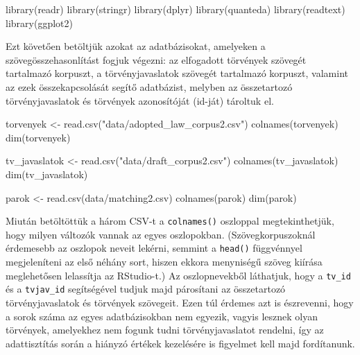 \documentclass[
]{book}
\newenvironment{Shaded}{\begin{snugshade}}{\end{snugshade}}
\newcommand{\FunctionTok}[1]{\textcolor[rgb]{0.00,0.00,0.00}{#1}}
\newcommand{\NormalTok}[1]{#1}
\newcommand{\OtherTok}[1]{\textcolor[rgb]{0.56,0.35,0.01}{#1}}
\newcommand{\StringTok}[1]{\textcolor[rgb]{0.31,0.60,0.02}{#1}}
\begin{document}
\begin{Shaded}
\begin{Highlighting}[]

\FunctionTok{library}\NormalTok{(readr)}
\FunctionTok{library}\NormalTok{(stringr)}
\FunctionTok{library}\NormalTok{(dplyr)}
\FunctionTok{library}\NormalTok{(quanteda)}
\FunctionTok{library}\NormalTok{(readtext)}
\FunctionTok{library}\NormalTok{(ggplot2)}
\end{Highlighting}
\end{Shaded}

Ezt követően betöltjük azokat az adatbázisokat, amelyeken a
szövegösszehasonlítást fogjuk végezni: az elfogadott törvények szövegét
tartalmazó korpuszt, a törvényjavaslatok szövegét tartalmazó korpuszt,
valamint az ezek összekapcsolását segítő adatbázist, melyben az
összetartozó törvényjavaslatok és törvények azonosítóját (id-ját)
tároltuk el.

\begin{Shaded}
\begin{Highlighting}[]
\NormalTok{torvenyek }\OtherTok{\textless{}{-}} \FunctionTok{read.csv}\NormalTok{(}\StringTok{"data/adopted\_law\_corpus2.csv"}\NormalTok{)}
\FunctionTok{colnames}\NormalTok{(torvenyek)}
\FunctionTok{dim}\NormalTok{(torvenyek)}
\end{Highlighting}
\end{Shaded}

\begin{Shaded}
\begin{Highlighting}[]
\NormalTok{tv\_javaslatok }\OtherTok{\textless{}{-}} \FunctionTok{read.csv}\NormalTok{(}\StringTok{"data/draft\_corpus2.csv"}\NormalTok{)}
\FunctionTok{colnames}\NormalTok{(tv\_javaslatok)}
\FunctionTok{dim}\NormalTok{(tv\_javaslatok)}
\end{Highlighting}
\end{Shaded}

\begin{Shaded}
\begin{Highlighting}[]
\NormalTok{parok }\OtherTok{\textless{}{-}} \FunctionTok{read.csv}\NormalTok{(}\StringTok{\textquotesingle{}data/matching2.csv\textquotesingle{}}\NormalTok{)}
\FunctionTok{colnames}\NormalTok{(parok)}
\FunctionTok{dim}\NormalTok{(parok)   }
\end{Highlighting}
\end{Shaded}

Miután betöltöttük a három CSV-t a \texttt{colnames()} oszloppal
megtekinthetjük, hogy milyen változók vannak az egyes oszlopokban.
(Szövegkorpuszoknál érdemesebb az oszlopok neveit lekérni, semmint a
\texttt{head()} függvénnyel megjeleníteni az első néhány sort, hiszen
ekkora menyniségű szöveg kiírása meglehetősen lelassítja az RStudio-t.)
Az oszlopnevekből láthatjuk, hogy a \texttt{tv\_id} és a
\texttt{tvjav\_id} segítségével tudjuk majd párosítani az összetartozó
törvényjavaslatok és törvények szövegeit. Ezen túl érdemes azt is
észrevenni, hogy a sorok száma az egyes adatbázisokban nem egyezik,
vagyis lesznek olyan törvények, amelyekhez nem fogunk tudni
törvényjavaslatot rendelni, így az adattisztítás során a hiányzó értékek
kezelésére is figyelmet kell majd fordítanunk.
\end{document}
